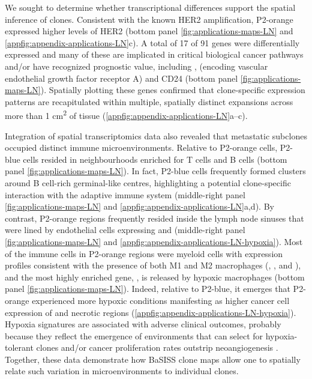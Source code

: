 We sought to determine whether transcriptional differences support the spatial inference of clones. Consistent with the known HER2 amplification, P2-orange expressed higher levels of HER2 (bottom panel \cref{fig:applications-maps-LN} and \cref{appfig:appendix-applications-LN}c). A total of 17 of 91 genes were differentially expressed and many of these are implicated in critical biological cancer pathways and/or have recognized prognostic value, including ,  (encoding vascular endothelial growth factor receptor A) and CD24 \parencite{Sereesongsaeng2020-vp, Kwon2015-jk} (bottom panel \cref{fig:applications-maps-LN}). Spatially plotting these genes confirmed that clone-specific expression patterns are recapitulated within multiple, spatially distinct expansions across more than 1 cm\textsuperscript{2} of tissue (\cref{appfig:appendix-applications-LN}a–c).

Integration of spatial transcriptomics data also revealed that metastatic subclones occupied distinct immune microenvironments. Relative to P2-orange cells, P2-blue cells resided in neighbourhoods enriched for T cells and B cells (bottom panel \cref{fig:applications-maps-LN}). In fact, P2-blue cells frequently formed clusters around B cell-rich germinal-like centres, highlighting a potential clone-specific interaction with the adaptive immune system (middle-right panel \cref{fig:applications-maps-LN} and \cref{appfig:appendix-applications-LN}a,d). By contrast, P2-orange regions frequently resided inside the lymph node sinuses that were lined by endothelial cells expressing  and  (middle-right panel \cref{fig:applications-maps-LN} and \cref{appfig:appendix-applications-LN-hypoxia}). Most of the immune cells in P2-orange regions were myeloid cells with expression profiles consistent with the presence of both M1 and M2 macrophages (, ,  and ), and the most highly enriched gene, , is released by hypoxic macrophages \parencite{Li2015-ng} (bottom panel \cref{fig:applications-maps-LN}). Indeed, relative to P2-blue, it emerges that P2-orange experienced more hypoxic conditions manifesting as higher cancer cell expression of  and necrotic regions (\cref{appfig:appendix-applications-LN-hypoxia}). Hypoxia signatures are associated with adverse clinical outcomes, probably because they reflect the emergence of environments that can select for hypoxia-tolerant clones and/or cancer proliferation rates outstrip neoangiogenesis \parencite{Cairns2004-vs}. Together, these data demonstrate how \ac{BaSISS} clone maps allow one to spatially relate such variation in microenvironments to individual clones.

